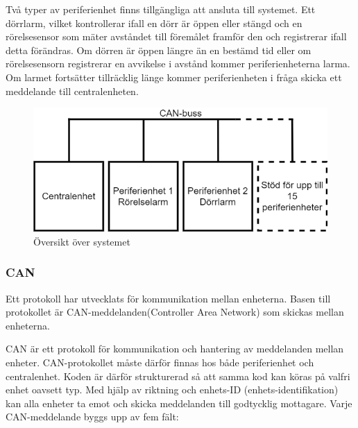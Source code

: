 \documentclass[a4paper]{article}
\begin{document}
Två typer av periferienhet finns tillgängliga att ansluta till systemet.
Ett dörrlarm, vilket kontrollerar ifall en dörr är öppen eller stängd och en rörelsesensor som mäter avståndet till föremålet framför den och registrerar ifall detta förändras.
Om dörren är öppen längre än en bestämd tid eller om rörelsesensorn registrerar en avvikelse i avstånd kommer periferienheterna larma.
Om larmet fortsätter tillräcklig länge kommer periferienheten i fråga skicka ett meddelande till centralenheten.

\begin{figure}[H]
    \centering
    \includegraphics[width=\textwidth]{canbuss-pp.png}
    \caption{Översikt över systemet}
\end{figure}


\subsubsection{CAN}
Ett protokoll har utvecklats för kommunikation mellan enheterna.
Basen till protokollet är CAN-meddelanden(Controller Area Network) som skickas mellan enheterna.

CAN är ett protokoll för kommunikation och hantering av meddelanden mellan enheter.
CAN-protokollet måste därför finnas hos både periferienhet och centralenhet.
Koden är därför strukturerad så att samma kod kan köras på valfri enhet oavsett typ.
Med hjälp av riktning och enhets-ID (enhets-identifikation) kan alla enheter ta emot och skicka meddelanden till godtycklig mottagare.
Varje CAN-meddelande byggs upp av fem fält:
\end{document}
